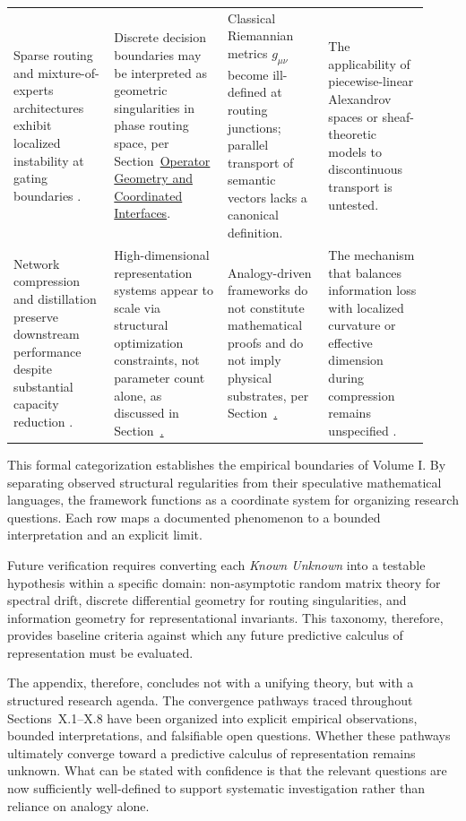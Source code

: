 \begin{longtable}{>{\RaggedRight}p{0.23\linewidth} >{\RaggedRight}p{0.23\linewidth} >{\RaggedRight}p{0.23\linewidth} >{\RaggedRight}p{0.23\linewidth}}
Sparse routing and mixture-of-experts architectures exhibit localized instability at gating boundaries \cite{shazeer2017outrageously, fedus2022switch}. 
& Discrete decision boundaries may be interpreted as geometric singularities in phase routing space, per Section~\hyperlink{sec:operator_geometry}{Operator Geometry and Coordinated Interfaces}. 
& Classical Riemannian metrics $g_{\mu\nu}$ become ill-defined at routing junctions; parallel transport of semantic vectors lacks a canonical definition. 
& The applicability of piecewise-linear Alexandrov spaces \cite{burago2001course} or sheaf-theoretic models \cite{curry2014sheaves} to discontinuous transport is untested. \\ 
\addlinespace

Network compression and distillation preserve downstream performance despite substantial capacity reduction \cite{hinton2015distilling, frankle2018lottery}. 
& High-dimensional representation systems appear to scale via structural optimization constraints, not parameter count alone, as discussed in Section~\hyperlink{sec:spectral_constraints}. 
& Analogy-driven frameworks do not constitute mathematical proofs and do not imply physical substrates, per Section~\hyperlink{sec:constraints_discipline}. 
& The mechanism that balances information loss with localized curvature or effective dimension during compression remains unspecified \cite{roy2019effectiveness}. \\ 
\bottomrule
\end{longtable}




This formal categorization establishes the empirical boundaries of Volume I. By separating observed structural regularities from their speculative mathematical languages, the framework functions as a coordinate system for organizing research questions. Each row maps a documented phenomenon to a bounded interpretation and an explicit limit. 

Future verification requires converting each \emph{Known Unknown} into a testable hypothesis within a specific domain: non-asymptotic random matrix theory for spectral drift, discrete differential geometry for routing singularities, and information geometry for representational invariants. This taxonomy, therefore, provides baseline criteria against which any future predictive calculus of representation must be evaluated.

The appendix, therefore, concludes not with a unifying theory, but with a structured research agenda. The convergence pathways traced throughout Sections~X.1–X.8 have been organized into explicit empirical observations, bounded interpretations, and falsifiable open questions. Whether these pathways ultimately converge toward a predictive calculus of representation remains unknown. What can be stated with confidence is that the relevant questions are now sufficiently well-defined to support systematic investigation rather than reliance on analogy alone.

